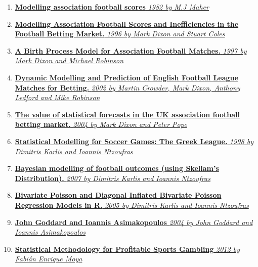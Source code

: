 \documentclass[article]{jss}
\providecommand{\tightlist}{%
  \setlength{\itemsep}{0pt}\setlength{\parskip}{0pt}}
\begin{document}
\begin{enumerate}
\def\labelenumi{\arabic{enumi}.}
\tightlist
\item
  \href{https://github.com/scibrokes/odds-modelling-and-testing-inefficiency-of-sports-bookmakers/blob/master/reference/Maher1982.pdf}{\textbf{Modelling
  association football scores} \emph{1982 by M.J Maher}}
\item
  \href{https://github.com/scibrokes/odds-modelling-and-testing-inefficiency-of-sports-bookmakers/blob/master/reference/DixonColes1996.pdf}{\textbf{Modelling
  Association Football Scores and Inefficiencies in the Football Betting
  Market.} \emph{1996 by Mark Dixon and Stuart Coles}}
\item
  \href{https://github.com/scibrokes/odds-modelling-and-testing-inefficiency-of-sports-bookmakers/blob/master/reference/DixonRobinson1997.pdf}{\textbf{A
  Birth Process Model for Association Football Matches.} \emph{1997 by
  Mark Dixon and Michael Robinson}}
\item
  \href{https://github.com/scibrokes/odds-modelling-and-testing-inefficiency-of-sports-bookmakers/blob/master/reference/DixonLedfordRobinson2001.pdf}{\textbf{Dynamic
  Modelling and Prediction of English Football League Matches for
  Betting.} \emph{2002 by Martin Crowder, Mark Dixon, Anthony Ledford
  and Mike Robinson}}
\item
  \href{https://github.com/scibrokes/odds-modelling-and-testing-inefficiency-of-sports-bookmakers/blob/master/reference/DixonPope2004.pdf}{\textbf{The
  value of statistical forecasts in the UK association football betting
  market.} \emph{2004 by Mark Dixon and Peter Pope}}
\item
  \href{https://github.com/scibrokes/odds-modelling-and-testing-inefficiency-of-sports-bookmakers/blob/master/reference/KarlisNtzoufras1998.pdf}{\textbf{Statistical
  Modelling for Soccer Games: The Greek League.} \emph{1998 by Dimitris
  Karlis and Ioannis Ntzoufras}}
\item
  \href{https://github.com/scibrokes/odds-modelling-and-testing-inefficiency-of-sports-bookmakers/blob/master/reference/KarlisNtzoufras2007.pdf}{\textbf{Bayesian
  modelling of football outcomes (using Skellam's Distribution).}
  \emph{2007 by Dimitris Karlis and Ioannis Ntzoufras}}
\item
  \href{https://github.com/scibrokes/odds-modelling-and-testing-inefficiency-of-sports-bookmakers/blob/master/reference/KarlisNtzoufras2005.pdf}{\textbf{Bivariate
  Poisson and Diagonal Inflated Bivariate Poisson Regression Models in
  R.} \emph{2005 by Dimitris Karlis and Ioannis Ntzoufras}}
\item
  \href{https://github.com/scibrokes/odds-modelling-and-testing-inefficiency-of-sports-bookmakers/blob/master/reference/GoddardAsimakopoulos2004.pdf}{\textbf{John
  Goddard and Ioannis Asimakopoulos} \emph{2004 by John Goddard and
  Ioannis Asimakopoulos}}
\item
  \href{https://github.com/scibrokes/odds-modelling-and-testing-inefficiency-of-sports-bookmakers/blob/master/reference/Moya2012.pdf}{\textbf{Statistical
  Methodology for Profitable Sports Gambling} \emph{2012 by Fabián
  Enrique Moya}}
\end{enumerate}
\end{document}
